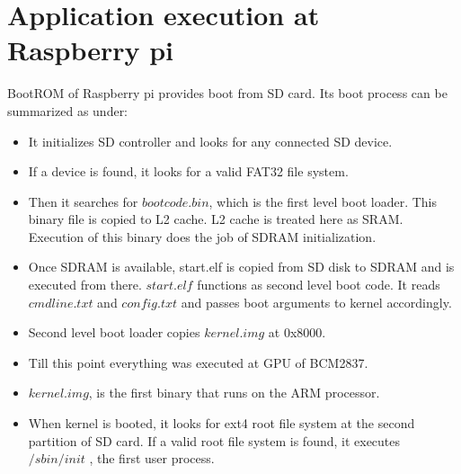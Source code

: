 \section {Application execution at Raspberry pi}
BootROM of Raspberry pi provides boot from SD card. Its boot process can
be summarized as under:
\begin{itemize}
	\item It initializes SD controller and looks for any connected
		SD device.
	\item If a device is found, it looks for a valid FAT32 file
		system.
	\item Then it searches for $bootcode.bin$, which is the first
		level boot loader. This binary file is copied to L2
		cache. L2 cache is treated here as SRAM. Execution of
		this binary does the job of SDRAM initialization.
	\item Once SDRAM is available, start.elf is copied from SD
		disk to SDRAM and is executed from there. $start.elf$
		functions as second level boot code. It reads
		$cmdline.txt$ and $config.txt$ and passes boot arguments to
		kernel accordingly.
	\item Second level boot loader copies $kernel.img$ at 0x8000.
	\item Till this point everything was executed at GPU of BCM2837.
	\item $kernel.img$, is the first binary that runs on the ARM
		processor.
	\item When kernel is booted, it looks for ext4 root file system at
		the second partition of SD card. If a valid root file
		system is found, it executes $/sbin/init$ , the first user
		process.
\end{itemize}

